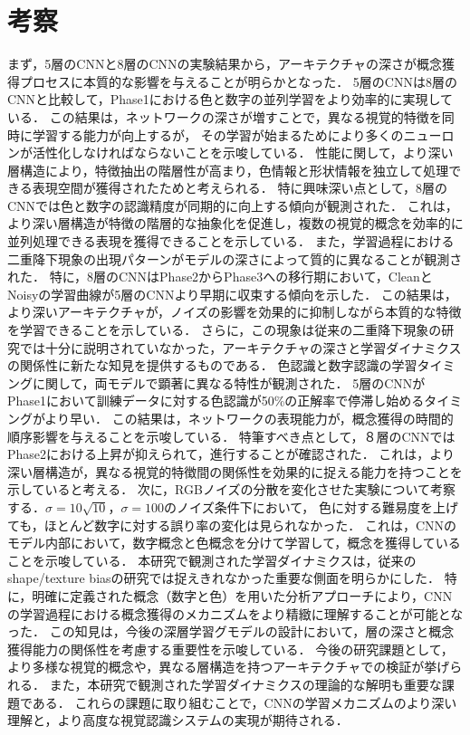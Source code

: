 \chapter{考察}
まず，5層のCNNと8層のCNNの実験結果から，アーキテクチャの深さが概念獲得プロセスに本質的な影響を与えることが明らかとなった．
5層のCNNは8層のCNNと比較して，Phase1における色と数字の並列学習をより効率的に実現している．
この結果は，ネットワークの深さが増すことで，異なる視覚的特徴を同時に学習する能力が向上するが，
その学習が始まるためにより多くのニューロンが活性化しなければならないことを示唆している．
性能に関して，より深い層構造により，特徴抽出の階層性が高まり，色情報と形状情報を独立して処理できる表現空間が獲得されたためと考えられる．
特に興味深い点として，8層のCNNでは色と数字の認識精度が同期的に向上する傾向が観測された．
これは，より深い層構造が特徴の階層的な抽象化を促進し，複数の視覚的概念を効率的に並列処理できる表現を獲得できることを示している．
また，学習過程における二重降下現象の出現パターンがモデルの深さによって質的に異なることが観測された．
特に，8層のCNNはPhase2からPhase3への移行期において，CleanとNoisyの学習曲線が5層のCNNより早期に収束する傾向を示した．
この結果は，より深いアーキテクチャが，ノイズの影響を効果的に抑制しながら本質的な特徴を学習できることを示している．
さらに，この現象は従来の二重降下現象の研究では十分に説明されていなかった，アーキテクチャの深さと学習ダイナミクスの関係性に新たな知見を提供するものである．
色認識と数字認識の学習タイミングに関して，両モデルで顕著に異なる特性が観測された．
5層のCNNがPhase1において訓練データに対する色認識が50\%の正解率で停滞し始めるタイミングがより早い．
この結果は，ネットワークの表現能力が，概念獲得の時間的順序影響を与えることを示唆している．
特筆すべき点として，８層のCNNではPhase2における上昇が抑えられて，進行することが確認された．
これは，より深い層構造が，異なる視覚的特徴間の関係性を効果的に捉える能力を持つことを示していると考える．
次に，RGBノイズの分散を変化させた実験について考察する．$\sigma = 10\sqrt{10}$，$\sigma = 100$のノイズ条件下において，
色に対する難易度を上げても，ほとんど数字に対する誤り率の変化は見られなかった．
これは，CNNのモデル内部において，数字概念と色概念を分けて学習して，概念を獲得していることを示唆している．
本研究で観測された学習ダイナミクスは，従来のshape/texture biasの研究では捉えきれなかった重要な側面を明らかにした．
特に，明確に定義された概念（数字と色）を用いた分析アプローチにより，CNNの学習過程における概念獲得のメカニズムをより精緻に理解することが可能となった．
この知見は，今後の深層学習グモデルの設計において，層の深さと概念獲得能力の関係性を考慮する重要性を示唆している．
今後の研究課題として，より多様な視覚的概念や，異なる層構造を持つアーキテクチャでの検証が挙げられる．
また，本研究で観測された学習ダイナミクスの理論的な解明も重要な課題である．
これらの課題に取り組むことで，CNNの学習メカニズムのより深い理解と，より高度な視覚認識システムの実現が期待される．
